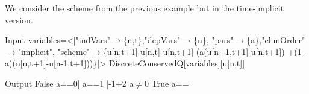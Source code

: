 \documentclass[runningheads]{llncs}
\newcommand{\1}{\chi}
\begin{document}
\begin{example}
	We consider the scheme from the previous example but in the time-implicit version.
	
	\begin{small}
		\begin{mmaCell}[moredefined={variables, DiscreteConservedQ}]{Input}
  variables=<|"indVars"\(\pmb{\to}\)\{n,t\},"depVars"\(\pmb{\to}\)\{u\},
  "pars"\(\pmb{\to}\)\{a\},"elimOrder"\(\pmb{\to}\)"implicit",
  "scheme"\(\pmb{\to}\)\{u[n,t+1]-u[n,t]-u[n,t+1]
  (a(u[n+1,t+1]-u[n,t+1])
  +(1-a)(u[n,t+1]-u[n-1,t+1]))\}|>
  DiscreteConservedQ[variables][u[n,t]]
  
\end{mmaCell}
		\begin{mmaCell}{Output}
  False		a==0||a==1||-1+2 a\(\neq\)0
  True		a==

\end{mmaCell}
	\end{small}
\end{example}
\end{document}

